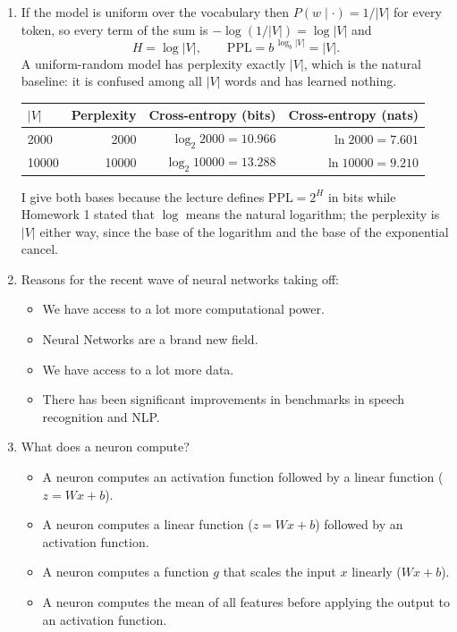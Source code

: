 \documentclass[11pt]{article}
\begin{document}
\begin{enumerate}
  \item If the model is uniform over the vocabulary then $P(w \mid \cdot) = 1/|V|$ for every token, so
        every term of the sum is $-\log(1/|V|) = \log|V|$ and
        \[
          H = \log |V|, \qquad \mathrm{PPL} = b^{\,\log_b |V|} = |V|.
        \]
        A uniform-random model has perplexity exactly $|V|$, which is the natural baseline: it is confused
        among all $|V|$ words and has learned nothing.
        \begin{center}
        \begin{tabular}{|l|r|r|r|}
          \hline
          $|V|$ & Perplexity & Cross-entropy (bits) & Cross-entropy (nats) \\
          \hline
          2000  & 2000  & $\log_2 2000 = 10.966$  & $\ln 2000 = 7.601$ \\
          10000 & 10000 & $\log_2 10000 = 13.288$ & $\ln 10000 = 9.210$ \\
          \hline
        \end{tabular}
        \end{center}
        I give both bases because the lecture defines $\mathrm{PPL} = 2^H$ in bits while Homework 1 stated
        that $\log$ means the natural logarithm; the perplexity is $|V|$ either way, since the base of the
        logarithm and the base of the exponential cancel.

  \item Reasons for the recent wave of neural networks taking off:
        \begin{itemize}
          \item[{[X]}] We have access to a lot more computational power.
          \item[{[\ ]}] Neural Networks are a brand new field.
          \item[{[X]}] We have access to a lot more data.
          \item[{[X]}] There has been significant improvements in benchmarks in speech recognition and NLP.
        \end{itemize}


  \item What does a neuron compute?
        \begin{itemize}
          \item[{[\ ]}] A neuron computes an activation function followed by a linear function
                ($z = Wx + b$).
          \item[{[X]}] A neuron computes a linear function ($z = Wx + b$) followed by an activation
                function.
          \item[{[\ ]}] A neuron computes a function $g$ that scales the input $x$ linearly ($Wx + b$).
          \item[{[\ ]}] A neuron computes the mean of all features before applying the output to an
                activation function.
        \end{itemize}



\end{enumerate}
\end{document}
